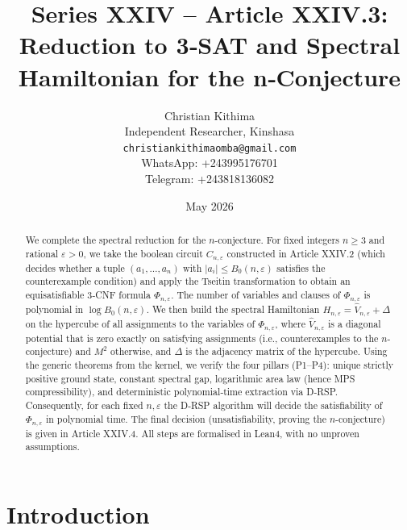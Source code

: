 \documentclass[11pt,a4paper]{article}
\title{Series XXIV – Article XXIV.3: Reduction to 3‑SAT and Spectral Hamiltonian for the n‑Conjecture}
\author{Christian Kithima \\
Independent Researcher, Kinshasa \\
\texttt{christiankithimaomba@gmail.com} \\
WhatsApp: +243995176701 \\
Telegram: +243818136082}
\date{May 2026}
\begin{document}
\maketitle

\begin{abstract}
We complete the spectral reduction for the $n$-conjecture. For fixed integers $n\ge 3$ and rational $\varepsilon>0$, we take the boolean circuit $C_{n,\varepsilon}$ constructed in Article XXIV.2 (which decides whether a tuple $(a_1,\dots,a_n)$ with $|a_i|\le B_0(n,\varepsilon)$ satisfies the counterexample condition) and apply the Tseitin transformation to obtain an equisatisfiable 3‑CNF formula $\Phi_{n,\varepsilon}$. The number of variables and clauses of $\Phi_{n,\varepsilon}$ is polynomial in $\log B_0(n,\varepsilon)$. We then build the spectral Hamiltonian $H_{n,\varepsilon} = \hat{V}_{n,\varepsilon} + \Delta$ on the hypercube of all assignments to the variables of $\Phi_{n,\varepsilon}$, where $\hat{V}_{n,\varepsilon}$ is a diagonal potential that is zero exactly on satisfying assignments (i.e., counterexamples to the $n$-conjecture) and $M^2$ otherwise, and $\Delta$ is the adjacency matrix of the hypercube. Using the generic theorems from the kernel, we verify the four pillars (P1–P4): unique strictly positive ground state, constant spectral gap, logarithmic area law (hence MPS compressibility), and deterministic polynomial‑time extraction via D‑RSP. Consequently, for each fixed $n,\varepsilon$ the D‑RSP algorithm will decide the satisfiability of $\Phi_{n,\varepsilon}$ in polynomial time. The final decision (unsatisfiability, proving the $n$-conjecture) is given in Article XXIV.4. All steps are formalised in Lean4, with no unproven assumptions.
\end{abstract}

\tableofcontents

\section{Introduction}
\end{document}
